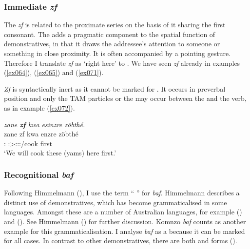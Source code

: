 \subsubsection{Immediate \emph{zf}} \label{immediate-demonstrative-subsec}

The   \emph{zf} is related to the proximate series on the basis of it sharing the first consonant. The  adds a pragmatic component to the spatial function of demonstratives, in that it draws the addressee's attention to someone or something in close proximity. It is often accompanied by a pointing gesture. Therefore I translate \emph{zf} as `right here' to . We have seen \emph{zf} already in examples (\ref{ex064}), (\ref{ex065}) and (\ref{ex071}).

\emph{Zf} is syntactically inert as it cannot be marked for . It occurs in preverbal position and only the TAM particles or the  may occur between the   and the verb, as in example (\ref{ex072}).

\begin{exe}
	\ex \emph{zane \textbf{zf} kwa esinzre zöbthé.}\\
	\gll zane zf kwa enzre zöbthé\\
	{\Dem}:{\Prox} {\Imm} {\Fut} \Fpl:\Sbj>\Stpl:\Obj:\Nonpast:\Ipfv/cook first\\
	\trans `We will cook these (yams) here first.' 
	\label{ex072}
\end{exe}

\subsubsection{Recognitional \emph{baf}} \label{recognitional-pronoun-subsec}

Following Himmelmann (\citeyear{Himmelmann:1996tp}), I use the term `` '' for \textit{baf}. Himmelmann describes a distinct  use of demonstratives, which has become grammaticalised in some languages. Amongst these are a number of Australian languages, for example  (\citealt{Heath:1984uk}) and  (\citealt{Goddard:1985tw}). See Himmelmann (\citeyear[231ff.]{Himmelmann:1996tp}) for further discussion. Komnzo \emph{baf} counts as another example for this grammaticalisation. I analyse \emph{baf} as a  because it can be marked for all cases. In contrast to other demonstratives, there are both  and  forms ().

